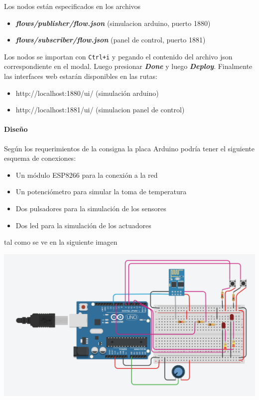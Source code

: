 \documentclass[11pt]{article}
\makeatletter
\def\maxwidth{\ifdim\Gin@nat@width>\linewidth\linewidth
    \else\Gin@nat@width\fi}
\let\Oldincludegraphics\includegraphics
\renewcommand{\includegraphics}[1]{\Oldincludegraphics[width=.8\maxwidth]{#1}}
\makeatother
\begin{document}
Los nodos están especificados en los archivos

\begin{itemize}
\item
  \textbf{\emph{flows/publisher/flow.json}} (simulacion arduino, puerto
  1880)
\item
  \textbf{\emph{flows/subscriber/flow.json}} (panel de control, puerto
  1881)
\end{itemize}

Los nodos se importan con \texttt{Ctrl+i} y pegando el contenido del
archivo json correspondiente en el modal. Luego presionar
\textbf{\emph{Done}} y luego \textbf{\emph{Deploy}}. Finalmente las
interfaces web estarán disponibles en las rutas:

\begin{itemize}
\item
  http://localhost:1880/ui/ (simulación arduino)
\item
  http://localhost:1881/ui/ (simulacion panel de control)
\end{itemize}

    \hypertarget{diseuxf1o}{%
\paragraph{Diseño\\}\label{diseuxf1o}}

Según los requerimientos de la consigna la placa Arduino podría tener el
siguiente esquema de conexiones:

\begin{itemize}
\item
  Un módulo ESP8266 para la conexión a la red
\item
  Un potenciómetro para simular la toma de temperatura
\item
  Dos pulsadores para la simulación de los sensores
\item
  Dos led para la simulación de los actuadores
\end{itemize}

tal como se ve en la siguiente imagen

    \includegraphics{images/placa.png}
\end{document}
